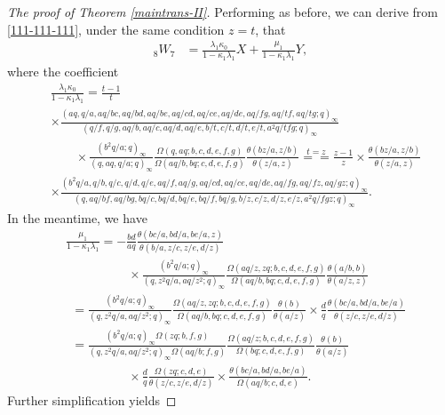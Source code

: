 \documentclass[xits,review,sort&compress]{elsarticle}
\numberwithin{equation}{section}
\newcommand{\poq}[2]{(#1;q)_{#2}}
\begin{document}
\begin{proof}[The  proof of Theorem \ref{maintrans-II}] Performing as before, we can derive from  \eqref{111-111-111}, under the same condition $z=t$, that
\begin{align}
 {}_{8}W_{7}&=\frac{\lambda_1\kappa_0}{1-\kappa_1\lambda_1} X+\frac{\mu_1}{1-\kappa_1\lambda_1}Y,\label{IDEN-two}
\end{align}
where the coefficient
\begin{align*}
&\frac{\lambda_1\kappa_0}{1-\kappa_1\lambda_1}
=\frac{t-1}{t}\\
&\times\frac{(aq, q / a, aq/bc,aq/bd,aq/be, aq / c d, aq / c e, aq / d e, aq / f g, aq / t f, aq / t g ; q)_{\infty}}{\left(q / f, q / g, aq/b,aq / c, aq / d, aq / e, b / t, c / t, d / t, e/ t, a^{2}q / t f g ; q\right)_{\infty}}\\
&\qquad\times \frac{\poq{b^2 q/a}{\infty}}{\poq{q,aq,q/a}{\infty}}\frac{\Omega(q,aq;b,c,d,e,f,g)}
{\Omega(aq/b,bq;c,d,e,f,g)}
\frac{\theta(bz/a,z/b)}{\theta(z/a,z)}\stackrel{t=z}{==}\frac{z-1}{z}\times
\frac{\theta(bz/a,z/b)}{\theta(z/a,z)}\\&\times\frac{(b^2 q/a,q/b,q/c,q/d,q/e,aq/f,aq/g,aq / c d, aq / c e, aq / d e, aq / f g, aq /fz, aq / g z; q)_{\infty}}{\left(q,aq/bf,aq/bg, bq/c,bq/d,bq/e,bq/f,bq/g,b /z, c /z, d /z, e/z, a^{2}q/f gz; q\right)_{\infty}}.
\end{align*}
In the meantime, we have
\begin{align*}
&\frac{\mu_1}{1-\kappa_1\lambda_1}=-\frac{bd}{aq}
\frac{\theta(bc/a,bd/a,be/a,z)}{\theta\left(b/a,z/c, z/e,d/z\right)}\\
&\qquad\qquad\quad\times\frac{\poq{b^2q/a}{\infty}}{\poq{q,z^2q/a,aq/z^2}{\infty}}
\frac{\Omega(aq/z,zq;b,c,d,e,f,g)}{\Omega(aq/b,bq;c,d,e,f,g)} \frac{\theta(a/b,b)}{\theta(a/z,z)}\\
&~~=\frac{\poq{b^2 q/a}{\infty}}{\poq{q,z^2q/a,aq/z^2}{\infty}}
\frac{\Omega(aq/z,zq;b,c,d,e,f,g)}{\Omega(aq/b,bq;c,d,e,f,g)} \frac{\theta(b)}{\theta(a/z)}\times\frac{d}{q}
\frac{\theta(bc/a,bd/a,be/a)}{\theta\left(z/c, z/e,d/z\right)}\\
&~~=\frac{\poq{b^2 q/a}{\infty}\Omega(zq;b,f,g)}{\poq{q,z^2q/a,aq/z^2}{\infty}\Omega(aq/b;f,g)}
\frac{\Omega(aq/z;b,c,d,e,f,g)}{\Omega(bq;c,d,e,f,g)} \frac{\theta(b)}{\theta(a/z)}
\\&\qquad\qquad\quad\times \frac{d}{q}
\frac{\Omega(zq;c,d,e)}{\theta\left(z/c, z/e,d/z\right)}\times
\frac{\theta(bc/a,bd/a,be/a)}{\Omega(aq/b;c,d,e)}.
\end{align*}
Further simplification yields

\end{proof}
\end{document}

